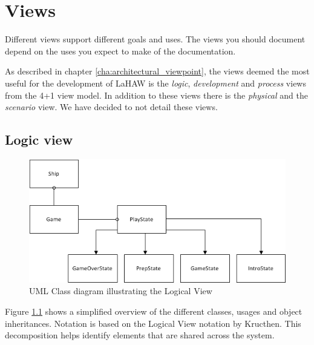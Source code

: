 \chapter{Views}


Different views support different goals and uses.
The views you should document depend on the uses you expect to make of the documentation.



As described in chapter \ref{cha:architectural_viewpoint}, the views deemed the most useful for the development of LaHAW is the \emph{logic}, \emph{development} and \emph{process} views from the 4+1 view model.
In addition to these views there is the \emph{physical} and the \emph{scenario} view. We have decided to not detail these views.



\section{Logic view}


\begin{figure}[ht]
    \includegraphics[width=\textwidth]{LogicalView.png}
    \caption{UML Class diagram illustrating the Logical View}
    \label{fig:LogicalView}
\end{figure}

Figure \ref{fig:LogicalView} shows a simplified overview of the different classes, usages and object inheritances. Notation is based on the Logical View notation by Kructhen\cite{kruchten}. This decomposition helps identify elements that are shared across the system.

